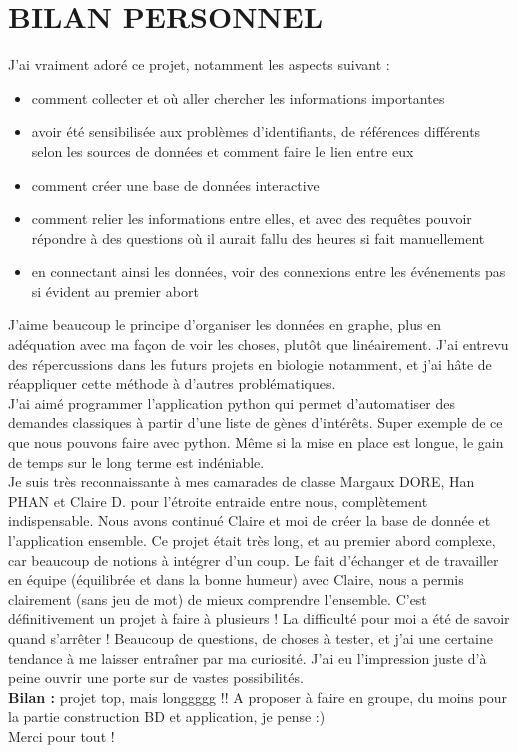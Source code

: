 \documentclass[a4paper,11pt,openright]{report}
\begin{document}
\section{BILAN PERSONNEL}
J'ai vraiment adoré ce projet, notamment les aspects suivant :
\begin{itemize}
	\item comment collecter et où aller chercher les informations importantes
	\item avoir été sensibilisée aux problèmes d'identifiants, de références différents selon les sources de données et comment faire le lien entre eux
	\item comment créer une base de données interactive
	\item comment relier les informations entre elles, et avec des requêtes pouvoir répondre à des questions où il aurait fallu des heures si fait manuellement
	\item en connectant ainsi les données, voir des connexions entre les événements pas si évident au premier abort
\end{itemize}
J'aime beaucoup le principe d'organiser les données en graphe, plus en adéquation avec ma façon de voir les choses, plutôt que linéairement. J'ai entrevu des répercussions dans les futurs projets en biologie notamment, et j'ai hâte de réappliquer cette méthode à d'autres problématiques. \\
J'ai aimé programmer l'application python qui permet d'automatiser des demandes classiques
à partir d'une liste de gènes d’intérêts. Super exemple de ce que nous pouvons faire avec python. Même si la mise en place est longue, le gain de temps sur le long terme est indéniable.\\
Je suis très reconnaissante à mes camarades de classe Margaux DORE, Han PHAN et Claire D. pour l'étroite entraide entre nous, complètement indispensable. Nous avons continué Claire et moi de créer la base de donnée et l'application ensemble. Ce projet était très long, et au premier abord complexe, car beaucoup de notions à intégrer d'un coup. Le fait d'échanger et de travailler en équipe (équilibrée et dans la bonne humeur) avec Claire,  nous a permis clairement (sans jeu de mot) de mieux comprendre l'ensemble. C'est définitivement un projet à faire à plusieurs ! 
La difficulté pour moi a été de savoir quand s'arrêter ! Beaucoup de questions, de choses à tester, et j'ai une certaine tendance à me laisser entraîner par ma curiosité. J'ai eu l'impression juste d'à peine ouvrir une porte sur de vastes possibilités. \\
\textbf{Bilan : } projet top, mais longgggg !! A proposer à faire en groupe, du moins pour la partie construction BD et application, je pense :) \\
Merci pour tout !
\end{document}
